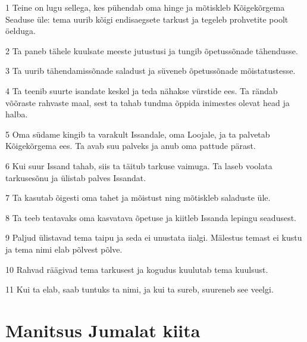 \par 1 Teine on lugu sellega, kes pühendab oma hinge ja mõtiskleb Kõigekõrgema Seaduse üle: tema uurib kõigi endisaegsete tarkust ja tegeleb prohvetite poolt öelduga.
\par 2 Ta paneb tähele kuulsate meeste jutustusi ja tungib õpetussõnade tähendusse.
\par 3 Ta uurib tähendamissõnade saladust ja süveneb õpetussõnade mõistatustesse.
\par 4 Ta teenib suurte isandate keskel ja teda nähakse vürstide ees. Ta rändab võõraste rahvaste maal, sest ta tahab tundma õppida inimestes olevat head ja halba.
\par 5 Oma südame kingib ta varakult Issandale, oma Loojale, ja ta palvetab Kõigekõrgema ees. Ta avab suu palveks ja anub oma pattude pärast.
\par 6 Kui suur Issand tahab, siis ta täitub tarkuse vaimuga. Ta laseb voolata tarkusesõnu ja ülistab palves Issandat.
\par 7 Ta kasutab õigesti oma tahet ja mõistust ning mõtiskleb saladuste üle.
\par 8 Ta teeb teatavaks oma kasvatava õpetuse ja kiitleb Issanda lepingu seadusest.
\par 9 Paljud ülistavad tema taipu ja seda ei unustata iialgi. Mälestus temast ei kustu ja tema nimi elab põlvest põlve.
\par 10 Rahvad räägivad tema tarkusest ja kogudus kuulutab tema kuulsust.
\par 11 Kui ta elab, saab tuntuks ta nimi, ja kui ta sureb, suureneb see veelgi.

\section*{Manitsus Jumalat kiita}

